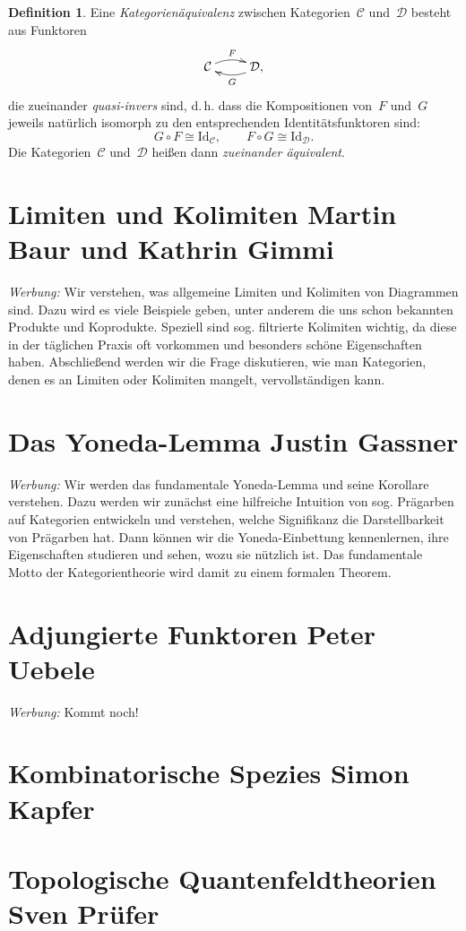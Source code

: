\documentclass[a4paper,ngerman]{scrartcl}
\theoremstyle{definition}
\newtheorem{defn}{Definition}[section]
\theoremstyle{plain}
\theoremstyle{remark}
\newcommand{\C}{\mathcal{C}}
\newcommand{\D}{\mathcal{D}}
\newcommand{\Id}{\mathrm{Id}}
\begin{document}
\begin{defn}
Eine \emph{Kategorienäquivalenz} zwischen Kategorien~$\C$ und~$\D$ besteht aus
Funktoren
\[ \xymatrix{\C \ar@/^/[r]^F & \D, \ar@/^/[l]^G} \]
die zueinander \emph{quasi-invers} sind, d.\,h. dass die Kompositionen von~$F$
und~$G$ jeweils natürlich isomorph zu den entsprechenden Identitätsfunktoren
sind:
\[ G \circ F \cong \Id_\C, \qquad F \circ G \cong \Id_\D. \]
Die Kategorien~$\C$ und~$\D$ heißen dann \emph{zueinander äquivalent}.
\end{defn}


\section[Limiten und Kolimiten]{Limiten und Kolimiten \hfill \small
Martin Baur und Kathrin Gimmi}

\emph{Werbung:} Wir verstehen, was allgemeine Limiten und Kolimiten von
Diagrammen sind. Dazu wird es viele Beispiele geben, unter anderem die uns
schon bekannten Produkte und Koprodukte. Speziell sind sog. filtrierte
Kolimiten wichtig, da diese in der täglichen Praxis oft vorkommen und besonders
schöne Eigenschaften haben. Abschließend werden wir die Frage diskutieren, wie
man Kategorien, denen es an Limiten oder Kolimiten mangelt, vervollständigen
kann.


\section[Das Yoneda-Lemma]{Das Yoneda-Lemma \hfill \small Justin Gassner}

\emph{Werbung:} Wir werden das fundamentale Yoneda-Lemma und seine Korollare
verstehen. Dazu werden wir zunächst eine hilfreiche Intuition von sog. Prägarben auf
Kategorien entwickeln und verstehen, welche Signifikanz die Darstellbarkeit von
Prägarben hat. Dann können wir die Yoneda-Einbettung kennenlernen, ihre
Eigenschaften studieren und sehen, wozu sie nützlich ist. Das fundamentale
Motto der Kategorientheorie wird damit zu einem formalen Theorem.


\section[Adjungierte Funktoren]{Adjungierte Funktoren \hfill \small Peter
Uebele}

\emph{Werbung:} Kommt noch!


\section[Kombinatorische Spezies]{Kombinatorische Spezies \hfill \small
Simon Kapfer}

\section[Topologische Quantenfeldtheorien]{Topologische Quantenfeldtheorien \hfill \small
Sven Prüfer}

\nocite{*}
\printbibliography
\end{document}
